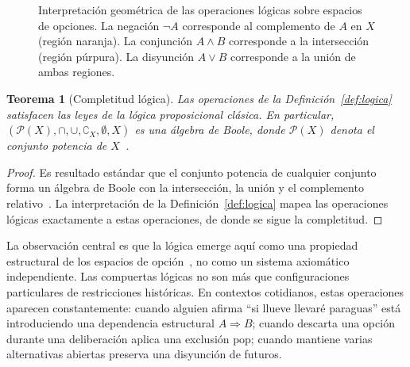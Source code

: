 \documentclass[12pt]{article}
\theoremstyle{plain}
\newtheorem{theorem}{Teorema}[section]
\theoremstyle{definition}
\begin{document}
\begin{figure}[ht]
\caption{Interpretación geométrica de las operaciones lógicas sobre espacios de opciones. La negación $\neg A$ corresponde al complemento de $A$ en $X$ (región naranja). La conjunción $A \land B$ corresponde a la intersección (región púrpura). La disyunción $A \lor B$ corresponde a la unión de ambas regiones.}
\label{fig:logica_geometrica}
\end{figure}

\begin{theorem}[Completitud lógica]
\label{thm:completitud_logica}
Las operaciones de la Definición~\ref{def:logica} satisfacen las leyes de la lógica proposicional clásica. En particular, $(\mathcal{P}(X), \cap, \cup, \complement_X, \emptyset, X)$ es una álgebra de Boole, donde $\mathcal{P}(X)$ denota el conjunto potencia de $X$~\cite{birkhoff}.
\end{theorem}

\begin{proof}
Es resultado estándar que el conjunto potencia de cualquier conjunto forma un álgebra de Boole con la intersección, la unión y el complemento relativo~\cite{birkhoff,maclane}. La interpretación de la Definición~\ref{def:logica} mapea las operaciones lógicas exactamente a estas operaciones, de donde se sigue la completitud.
\end{proof}

La observación central es que la lógica emerge aquí como una propiedad estructural de los espacios de opción~\cite{girard}, no como un sistema axiomático independiente. Las compuertas lógicas no son más que configuraciones particulares de restricciones históricas. En contextos cotidianos, estas operaciones aparecen constantemente: cuando alguien afirma ``si llueve llevaré paraguas'' está introduciendo una dependencia estructural $A \Rightarrow B$; cuando descarta una opción durante una deliberación aplica una exclusión $\mathrm{pop}$; cuando mantiene varias alternativas abiertas preserva una disyunción de futuros.
\end{document}
